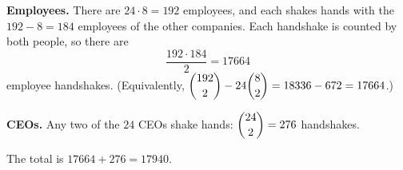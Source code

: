 \textbf{Employees.} There are $24\cdot8=192$ employees, and each shakes hands with the $192-8=184$ employees of the other companies. Each handshake is counted by both people, so there are
\[\dfrac{192\cdot184}{2}=17664\]
employee handshakes. (Equivalently, $\dbinom{192}{2}-24\dbinom82=18336-672=17664$.)

\textbf{CEOs.} Any two of the $24$ CEOs shake hands: $\dbinom{24}{2}=276$ handshakes.

The total is $17664+276=\boxed{17940}$.
